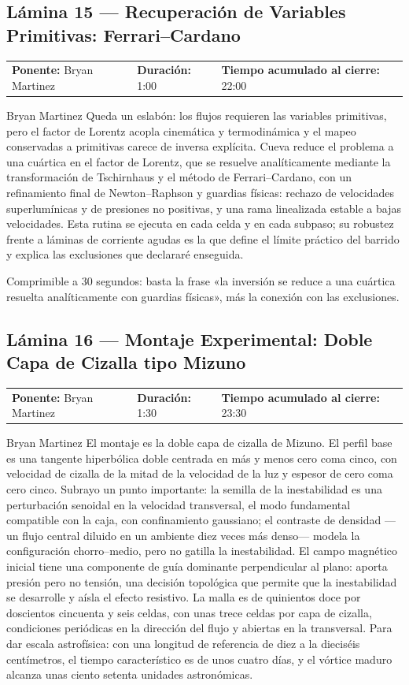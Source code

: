 \documentclass[11pt,letterpaper]{article}
\makeatletter
\newcommand{\lamina}[5]{%
  \subsection*{Lámina #1 --- #2}
  \noindent
  \begin{tabular}{@{}llll@{}}
    \textbf{Ponente:} #3 &\quad \textbf{Duración:} #4 &\quad
    \textbf{Tiempo acumulado al cierre:} #5 &
  \end{tabular}
  \vspace{2pt}}
\makeatother
\begin{document}
\lamina{15}{Recuperación de Variables Primitivas: Ferrari--Cardano}{Bryan Martinez}{1:00}{22:00}

\begin{parlamento}{Bryan Martinez}
Queda un eslabón: los flujos requieren las variables primitivas, pero el
factor de Lorentz acopla cinemática y termodinámica y el mapeo conservadas a
primitivas carece de inversa explícita. Cueva reduce el problema a una
cuártica en el factor de Lorentz, que se resuelve analíticamente mediante la
transformación de Tschirnhaus y el método de Ferrari--Cardano, con un
refinamiento final de Newton--Raphson y guardias físicas: rechazo de
velocidades superlumínicas y de presiones no positivas, y una rama
linealizada estable a bajas velocidades. Esta rutina se ejecuta en cada
celda y en cada subpaso; su robustez frente a láminas de corriente agudas es
la que define el límite práctico del barrido y explica las exclusiones que
declararé enseguida.
\end{parlamento}

\begin{indicaciones}
Comprimible a 30 segundos: basta la frase «la inversión se reduce a una
cuártica resuelta analíticamente con guardias físicas», más la conexión con
las exclusiones.
\end{indicaciones}

\lamina{16}{Montaje Experimental: Doble Capa de Cizalla tipo Mizuno}{Bryan Martinez}{1:30}{23:30}

\begin{parlamento}{Bryan Martinez}
El montaje es la doble capa de cizalla de Mizuno. El perfil base es una
tangente hiperbólica doble centrada en más y menos cero coma cinco, con
velocidad de cizalla de la mitad de la velocidad de la luz y espesor de cero
coma cero cinco. Subrayo un punto importante: la semilla de la inestabilidad
es una perturbación senoidal en la velocidad transversal, el modo
fundamental compatible con la caja, con confinamiento gaussiano; el
contraste de densidad ---un flujo central diluido en un ambiente diez veces
más denso--- modela la configuración chorro--medio, pero no gatilla la
inestabilidad. El campo magnético inicial tiene una componente de guía
dominante perpendicular al plano: aporta presión pero no tensión, una
decisión topológica que permite que la inestabilidad se desarrolle y aísla
el efecto resistivo. La malla es de quinientos doce por doscientos
cincuenta y seis celdas, con unas trece celdas por capa de cizalla,
condiciones periódicas en la dirección del flujo y abiertas en la
transversal. Para dar escala astrofísica: con una longitud de referencia de
diez a la dieciséis centímetros, el tiempo característico es de unos cuatro
días, y el vórtice maduro alcanza unas ciento setenta unidades
astronómicas.
\end{parlamento}
\end{document}
